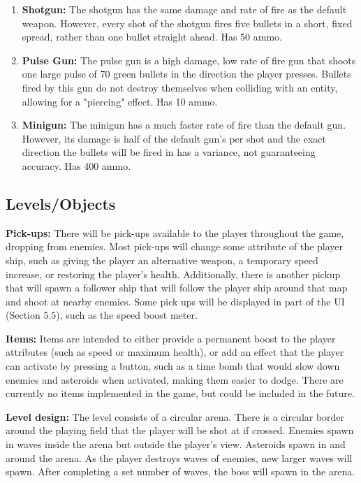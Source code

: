 \documentclass[12pt]{article}       %
\begin{document}
	\begin{enumerate}
	\item {\bf Shotgun:} The shotgun has the same damage and rate of fire as the default weapon. However, every shot of the shotgun fires five bullets in a short, fixed spread, rather than one bullet straight ahead. Has 50 ammo.

	\item {\bf Pulse Gun:} The pulse gun is a high damage, low rate of fire gun that shoots one large pulse of 70 green bullets in the direction the player presses. Bullets fired by this gun do not destroy themselves when colliding with an entity, allowing for a "piercing" effect. Has 10 ammo.

	\item {\bf Minigun:} The minigun has a much faster rate of fire than the default gun. However, its damage is half of the default gun's per shot and the exact direction the bullets will be fired in has a variance, not guaranteeing accuracy. Has 400 ammo.
	\end{enumerate}


\subsection{Levels/Objects} %

	{\bf Pick-ups:}  There will be pick-ups available to the player throughout the game, dropping from enemies. Most pick-ups will change some attribute of the player ship, such as giving the player an alternative weapon, a temporary speed increase, or restoring the player's health. Additionally, there is another pickup that will spawn a follower ship that will follow the player ship around that map and shoot at nearby enemies. Some pick ups will be displayed in part of the UI (Section 5.5), such as the speed boost meter.

	{\bf  Items:} Items are intended to either provide a permanent boost to the player attributes (such as speed or maximum health), or add an effect that the player can activate by pressing a button, such as a time bomb that would slow down enemies and asteroids when activated, making them easier to dodge. There are currently no items implemented in the game, but could be included in the future. 

	{\bf Level design:} The level consists of a circular arena. There is a circular border around the playing field that the player will be shot at if crossed. Enemies spawn in waves inside the arena but outside the player's view. Asteroids spawn in and around the arena. As the player destroys waves of enemies, new larger waves will spawn. After completing a set number of waves, the boss will spawn in the arena.
\end{document}

